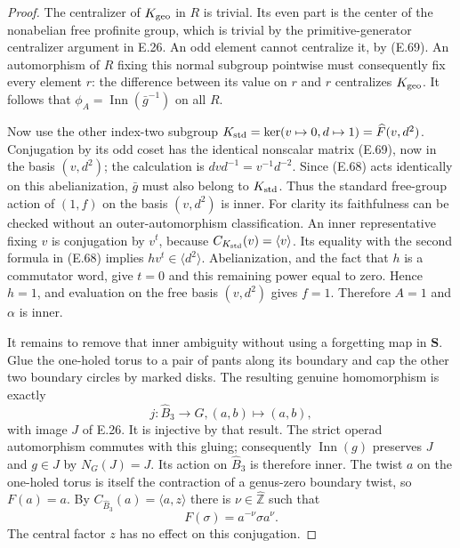 \begin{proof}
The centralizer of $K_{\rm geo}$ in $R$ is
trivial.  Its even part is the center of the
nonabelian free profinite group, which is
trivial by the primitive-generator centralizer
argument in E.26.  An odd element cannot
centralize it, by (E.69).
An automorphism of $R$ fixing this normal
subgroup pointwise must consequently fix every
element $r$: the difference between its value
on $r$ and $r$ centralizes $K_{\rm geo}$.
It follows that
$\phi_A=\operatorname{Inn}(\bar g^{-1})$ on all $R$.

Now use the other index-two subgroup
$K_{\rm std}=\ker(v\mapsto0,d\mapsto1)=
\widehat F(v,d^2)$.
Conjugation by its odd coset has the identical
nonscalar matrix (E.69), now in the basis
$(v,d^2)$; the calculation is
$dvd^{-1}=v^{-1}d^{-2}$.
Since (E.68) acts identically on this
abelianization, $\bar g$ must also belong to
$K_{\rm std}$.
Thus the standard free-group action of
$(1,f)$ on the basis $(v,d^2)$ is inner.
For clarity its faithfulness can be checked
without an outer-automorphism classification.
An inner representative fixing $v$ is conjugation
by $v^t$, because $C_{K_{\rm std}}(v)=\langle v\rangle$.
Its equality with the second formula in (E.68)
implies $hv^t\in\langle d^2\rangle$.
Abelianization, and the fact that $h$ is a
commutator word, give $t=0$ and this remaining
power equal to zero.  Hence $h=1$, and
evaluation on the free basis $(v,d^2)$ gives
$f=1$.  Therefore $A=1$ and $\alpha$ is inner.

It remains to remove that inner ambiguity
without using a forgetting map in $\mathbf S$.
Glue the one-holed torus to a pair of pants
along its boundary and cap the other two
boundary circles by marked disks.  The
resulting genuine homomorphism is exactly
\[
        j:\widehat B_3\longrightarrow G,
                 (a,b)\longmapsto(a,b),
\]
with image $J$ of E.26.  It is injective by
that result.  The strict operad automorphism
commutes with this gluing; consequently
$\operatorname{Inn}(g)$ preserves $J$ and
$g\in J$ by $N_G(J)=J$.
Its action on $\widehat B_3$ is therefore inner.
The twist $a$ on the one-holed torus is itself
the contraction of a genus-zero boundary twist,
so $F(a)=a$.
By $C_{\widehat B_3}(a)=\langle a,z\rangle$
there is $\nu\in\widehat{\mathbb Z}$ such that
\[
                   F(\sigma)=a^{-\nu}\sigma a^\nu.      \tag{E.70}
\]
The central factor $z$ has no effect on this
conjugation.


\end{proof}
